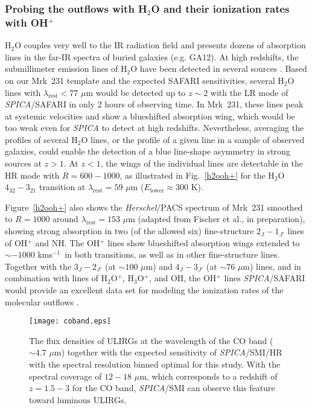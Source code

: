 \documentclass{pasa}%
\newcommand{\kms}{{\hbox {km\thinspace s$^{-1}$}}}
\begin{document}
\subsubsection{Probing the outflows with H$_2$O and their ionization rates 
with OH$^+$} 
\label{sec:h2ooh+}




H$_2$O couples very well to the IR radiation field and presents dozens of
absorption lines in the far-IR spectra of buried galaxies (e.g. GA12). 
At high redshifts, the submillimeter emission lines of H$_2$O have been
detected in several sources 
\citep{wer11,omo11,omo13,yan13,yan16,rie13,gul16}.
Based on our Mrk~231 template and the expected SAFARI sensitivities, several
H$_2$O lines with $\lambda_{\mathrm{rest}}<77$ $\mu$m would be detected up to
$z\sim2$ with the LR mode of {\it SPICA}/SAFARI in only 2 hours of observing
time. In Mrk~231, these lines peak at systemic velocities and show a
blueshifted absorption wing, which would be too weak even for {\it SPICA}  to
detect at high redshifts. Nevertheless, averaging the profiles of several
H$_2$O lines, or the profile of a given line in a sample of observed
  galaxies, could enable the detection of a blue line-shape asymmetry in 
strong sources at $z>1$. At $z<1$, the wings of the individual lines are
detectable in the HR mode with $R=600-1000$, as illustrated in
Fig.~\ref{h2ooh+} for the H$_2$O $4_{32}-3_{21}$ transition at
$\lambda_{\mathrm{rest}}=59$ $\mu$m ($E_{\mathrm{lower}}\approx300$ K).  

Figure~\ref{h2ooh+} also shows the {\it Herschel}/PACS spectrum of Mrk~231
smoothed to $R=1000$ around $\lambda_{\mathrm{rest}}=153$ $\mu$m (adapted from
Fischer et al., in preparation), showing strong absorption in two (of the
allowed six) fine-structure $2_{J}-1_{J'}$ lines of OH$^+$ and NH. The OH$^+$
lines show blueshifted absorption wings extended to $\sim-1000$ \kms\ in both
transitions, as well as in other fine-structure lines. Together with the
$3_{J}-2_{J'}$ (at $\sim100$ $\mu$m) and $4_{J}-3_{J'}$ (at $\sim76$ $\mu$m)
lines, and in combination  with lines of H$_2$O$^+$, H$_3$O$^+$, and OH, the
OH$^+$ lines {\it SPICA}/SAFARI would provide an excellent data set for
modeling the ionization rates of the molecular outflows 
\citep{gon13,tak16}.

\begin{figure}
\begin{center}
\texttt{[image: coband.eps]}
\caption{The flux densities of ULIRGs at the wavelength of the CO band
  ($\sim4.7$ $\mu$m) together with the expected sensitivity of 
{\it SPICA}/SMI/HR with the spectral resolution binned optimal for this
study. With the spectral coverage of $12-18$ $\mu$m, which corresponds to a
redshift of $z = 1.5-3$ for the CO band, {\it SPICA}/SMI can observe this
feature toward luminous ULIRGs. 
} 
\label{coband}
\end{center}
\end{figure}
\end{document}
